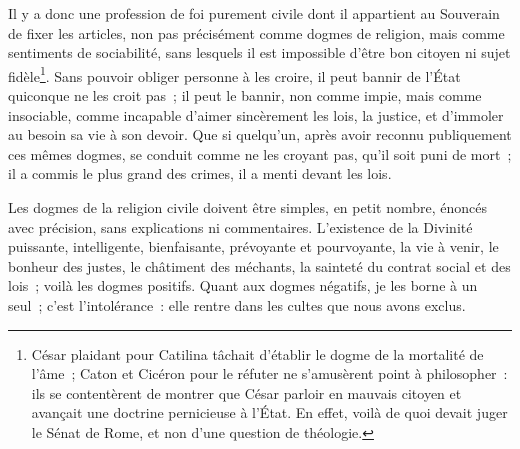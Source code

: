 \documentclass[french,twoside]{book} %
\begin{document}
Il y a donc une profession de foi purement civile dont il appartient au Souverain de fixer les articles, non pas précisément comme dogmes de religion, mais comme sentiments de sociabilité, sans lesquels il est impossible d’être bon citoyen ni sujet fidèle\footnote{César plaidant pour Catilina tâchait d’établir le dogme de la mortalité de l’âme ; Caton et Cicéron pour le réfuter ne s’amusèrent point à philosopher : ils se contentèrent de montrer que César parloir en mauvais citoyen et avançait une doctrine pernicieuse à l’État. En effet, voilà de quoi devait juger le Sénat de Rome, et non d’une question de théologie.}. Sans pouvoir obliger personne à les croire, il peut bannir de l’État quiconque ne les croit pas ; il peut le bannir, non comme impie, mais comme insociable, comme incapable d’aimer sincèrement les lois, la justice, et d’immoler au besoin sa vie à son devoir. Que si quelqu’un, après avoir reconnu publiquement ces mêmes dogmes, se conduit comme ne les croyant pas, qu’il soit puni de mort ; il a commis le plus grand des crimes, il a menti devant les lois.\par
Les dogmes de la religion civile doivent être simples, en petit nombre, énoncés avec précision, sans explications ni commentaires. L’existence de la Divinité puissante, intelligente, bienfaisante, prévoyante et pourvoyante, la vie à venir, le bonheur des justes, le châtiment des méchants, la sainteté du contrat social et des lois ; voilà les dogmes positifs. Quant aux dogmes négatifs, je les borne à un seul ; c’est l’intolérance : elle rentre dans les cultes que nous avons exclus.\par
\end{document}
